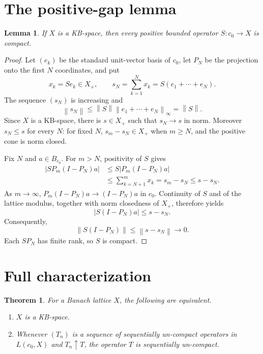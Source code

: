 \documentclass[11pt]{article}
\newtheorem{theorem}{Theorem}
\newtheorem{lemma}{Lemma}
\newcommand{\norm}[1]{\left\lVert #1\right\rVert}
\begin{document}
\section*{The positive-gap lemma}

\begin{lemma}\label{lem:positive-c0}
If $X$ is a KB-space, then every positive bounded operator
$S:c_0\to X$ is compact.
\end{lemma}

\begin{proof}
Let $(e_k)$ be the standard unit-vector basis of $c_0$, let $P_N$ be the
projection onto the first $N$ coordinates, and put
\[
 x_k=Se_k\in X_+,
 \qquad
 s_N=\sum_{k=1}^N x_k=S(e_1+\cdots+e_N).
\]
The sequence $(s_N)$ is increasing and
\[
 \norm{s_N}\leq \norm{S}\norm{e_1+\cdots+e_N}_\infty=\norm{S}.
\]
Since $X$ is a KB-space, there is $s\in X_+$ such that
$s_N\to s$ in norm. Moreover $s_N\leq s$ for every $N$: for fixed $N$,
$s_m-s_N\in X_+$ when $m\geq N$, and the positive cone is norm closed.

Fix $N$ and $a\in B_{c_0}$. For $m>N$, positivity of $S$ gives
\begin{align*}
 \bigl|S P_m(I-P_N)a\bigr|
 &\leq S\bigl|P_m(I-P_N)a\bigr| \\
 &\leq \sum_{k=N+1}^{m} x_k
   =s_m-s_N
 \leq s-s_N.
\end{align*}
As $m\to\infty$, $P_m(I-P_N)a\to(I-P_N)a$ in $c_0$. Continuity of $S$ and
of the lattice modulus, together with norm closedness of $X_+$, therefore
yields
\[
 \bigl|S(I-P_N)a\bigr|\leq s-s_N.
\]
Consequently,
\[
 \norm{S(I-P_N)}\leq \norm{s-s_N}\longrightarrow0.
\]
Each $SP_N$ has finite rank, so $S$ is compact.
\end{proof}

\section*{Full characterization}

\begin{theorem}\label{thm:main}
For a Banach lattice $X$, the following are equivalent.
\begin{enumerate}
\item $X$ is a KB-space.
\item Whenever $(T_n)$ is a sequence of sequentially un-compact operators in
  $L(c_0,X)$ and $T_n\uparrow T$, the operator $T$ is sequentially
  un-compact.
\end{enumerate}
\end{theorem}
\end{document}
